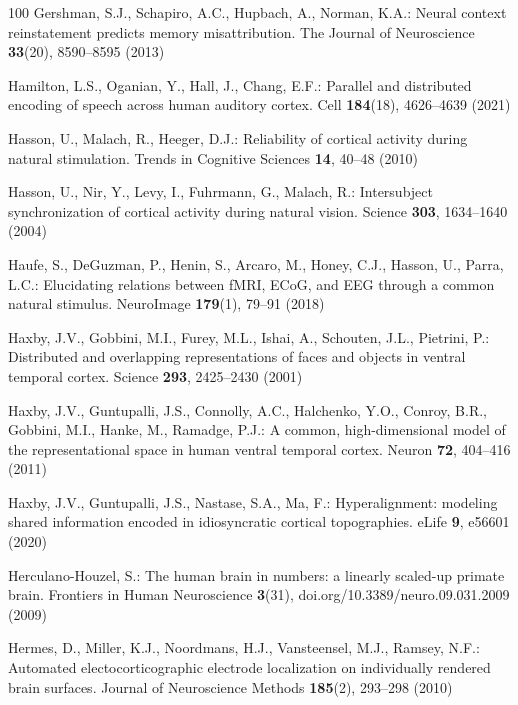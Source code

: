 \documentclass[runningheads]{llncs}
\begin{document}
\begin{thebibliography}{100}
Gershman, S.J., Schapiro, A.C., Hupbach, A., Norman, K.A.: Neural context
  reinstatement predicts memory misattribution. The Journal of Neuroscience
  \textbf{33}(20),  8590--8595 (2013)

Hamilton, L.S., Oganian, Y., Hall, J., Chang, E.F.: Parallel and distributed
  encoding of speech across human auditory cortex. Cell  \textbf{184}(18),
  4626--4639 (2021)

Hasson, U., Malach, R., Heeger, D.J.: Reliability of cortical activity during
  natural stimulation. Trends in Cognitive Sciences  \textbf{14},  40--48
  (2010)

Hasson, U., Nir, Y., Levy, I., Fuhrmann, G., Malach, R.: Intersubject
  synchronization of cortical activity during natural vision. Science
  \textbf{303},  1634--1640 (2004)

Haufe, S., {DeGuzman}, P., Henin, S., Arcaro, M., Honey, C.J., Hasson, U.,
  Parra, L.C.: Elucidating relations between {fMRI}, {ECoG}, and {EEG} through
  a common natural stimulus. {NeuroImage}  \textbf{179}(1),  79--91 (2018)

Haxby, J.V., Gobbini, M.I., Furey, M.L., Ishai, A., Schouten, J.L., Pietrini,
  P.: Distributed and overlapping representations of faces and objects in
  ventral temporal cortex. Science  \textbf{293},  2425--2430 (2001)

Haxby, J.V., Guntupalli, J.S., Connolly, A.C., Halchenko, Y.O., Conroy, B.R.,
  Gobbini, M.I., Hanke, M., Ramadge, P.J.: A common, high-dimensional model of
  the representational space in human ventral temporal cortex. Neuron
  \textbf{72},  404--416 (2011)

Haxby, J.V., Guntupalli, J.S., Nastase, S.A., Ma, F.: Hyperalignment: modeling
  shared information encoded in idiosyncratic cortical topographies. {eLife}
  \textbf{9},  e56601 (2020)

Herculano-Houzel, S.: The human brain in numbers: a linearly scaled-up primate
  brain. Frontiers in Human Neuroscience  \textbf{3}(31),
  doi.org/10.3389/neuro.09.031.2009 (2009)

Hermes, D., Miller, K.J., Noordmans, H.J., Vansteensel, M.J., Ramsey, N.F.:
  Automated electocorticographic electrode localization on individually
  rendered brain surfaces. Journal of Neuroscience Methods  \textbf{185}(2),
  293--298 (2010)


\end{thebibliography}
\end{document}
